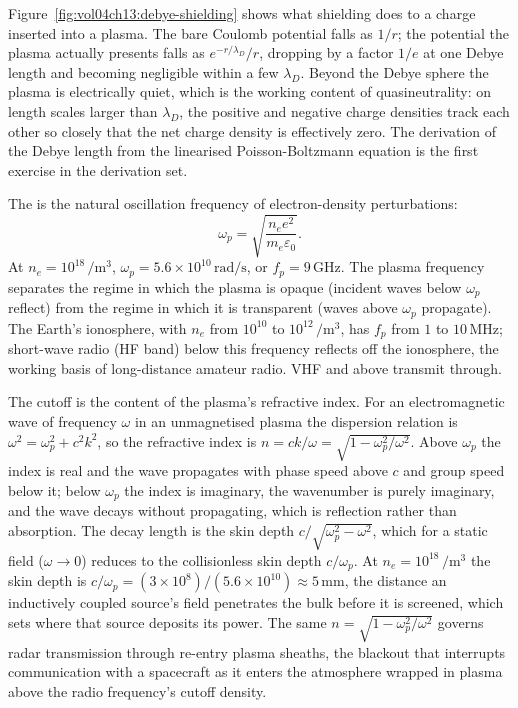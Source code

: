 

Figure~\ref{fig:vol04ch13:debye-shielding} shows what shielding does to a
charge inserted into a plasma. The bare Coulomb potential falls as $1/r$;
the potential the plasma actually presents falls as
$e^{-r/\lambda_{D}}/r$, dropping by a factor $1/e$ at one Debye length and
becoming negligible within a few $\lambda_{D}$. Beyond the Debye sphere
the plasma is electrically quiet, which is the working content of
quasineutrality: on length scales larger than $\lambda_{D}$, the positive
and negative charge densities track each other so closely that the net
charge density is effectively zero. The derivation of the Debye length
from the linearised Poisson-Boltzmann equation is the first exercise in
the derivation set.

The  is the natural oscillation frequency
of electron-density perturbations:
\[
\omega_{p} = \sqrt{\frac{n_{e}e^{2}}{m_{e}\varepsilon_{0}}}.
\]
At $n_{e} = 10^{18}\,\si{\per\meter\cubed}$, $\omega_{p} = 5.6\times
10^{10}\,\si{\radian\per\second}$, or $f_{p} = 9\,\si{\giga\hertz}$.
The plasma frequency separates the regime in which the plasma is
opaque (incident waves below $\omega_{p}$ reflect) from the regime
in which it is transparent (waves above $\omega_{p}$ propagate). The
Earth's ionosphere, with $n_{e}$ from $10^{10}$ to $10^{12}\,\si{
\per\meter\cubed}$, has $f_{p}$ from $1$ to $10\,\si{\mega\hertz}$;
short-wave radio (HF band) below this frequency reflects off the
ionosphere, the working basis of long-distance amateur radio. VHF and
above transmit through.

The cutoff is the content of the plasma's refractive index. For an
electromagnetic wave of frequency $\omega$ in an unmagnetised plasma the
dispersion relation is $\omega^{2} = \omega_p^{2} + c^{2}k^{2}$, so the
refractive index is $n = ck/\omega = \sqrt{1 - \omega_p^{2}/\omega^{2}}$.
Above $\omega_p$ the index is real and the wave propagates with phase speed
above $c$ and group speed below it; below $\omega_p$ the index is imaginary,
the wavenumber is purely imaginary, and the wave decays without
propagating, which is reflection rather than absorption. The decay length is
the skin depth $c/\sqrt{\omega_p^{2}-\omega^{2}}$, which for a static field
($\omega\to 0$) reduces to the collisionless skin depth $c/\omega_p$. At
$n_e = 10^{18}\,\si{\per\meter\cubed}$ the skin depth is $c/\omega_p =
(3\times 10^{8})/(5.6\times 10^{10}) \approx 5\,\si{\milli\meter}$, the
distance an inductively coupled source's field penetrates the bulk before it
is screened, which sets where that source deposits its power. The same
$n=\sqrt{1-\omega_p^2/\omega^2}$ governs radar transmission through
re-entry plasma sheaths, the blackout that interrupts communication with a
spacecraft as it enters the atmosphere wrapped in plasma above the radio
frequency's cutoff density.

